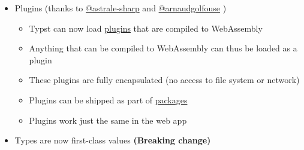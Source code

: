 \begin{itemize}
\tightlist
\item
  Plugins (thanks to
  \href{https://github.com/astrale-sharp}{@astrale-sharp} and
  \href{https://github.com/arnaudgolfouse}{@arnaudgolfouse} )

  \begin{itemize}
  \tightlist
  \item
    Typst can now load
    \href{/docs/reference/foundations/plugin/}{plugins} that are
    compiled to WebAssembly
  \item
    Anything that can be compiled to WebAssembly can thus be loaded as a
    plugin
  \item
    These plugins are fully encapsulated (no access to file system or
    network)
  \item
    Plugins can be shipped as part of
    \href{/docs/reference/scripting/\#packages}{packages}
  \item
    Plugins work just the same in the web app
  \end{itemize}
\item
  Types are now first-class values \textbf{(Breaking change)}


\end{itemize}
